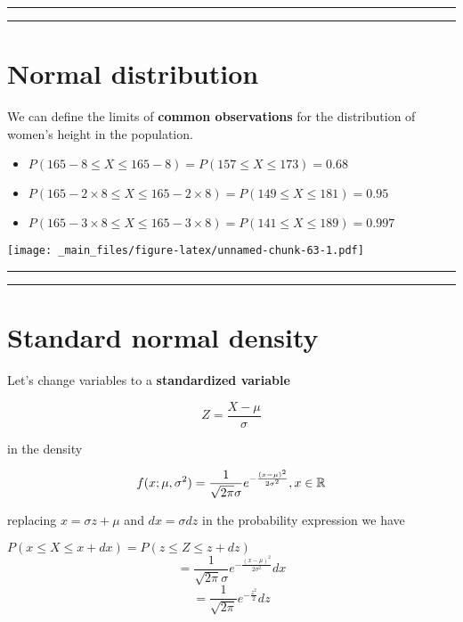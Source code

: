 \documentclass[
]{book}
\providecommand{\tightlist}{%
  \setlength{\itemsep}{0pt}\setlength{\parskip}{0pt}}
\begin{document}
\begin{center}\rule{0.5\linewidth}{0.5pt}\end{center}

\begin{center}\rule{0.5\linewidth}{0.5pt}\end{center}

\hypertarget{normal-distribution-5}{%
\section{Normal distribution}\label{normal-distribution-5}}

We can define the limits of \textbf{common observations} for the distribution of women's height in the population.

\begin{itemize}
\tightlist
\item
  \(P(165-8 \leq X \leq 165-8)=P(157 \leq X \leq 173)=0.68\)
\item
  \(P(165-2 \times 8 \leq X \leq 165-2\times 8)=P(149 \leq X \leq 181)=0.95\)
\item
  \(P(165-3 \times 8 \leq X \leq 165-3\times 8)=P(141 \leq X \leq 189)=0.997\)
\end{itemize}

\texttt{[image: \_main\_files/figure-latex/unnamed-chunk-63-1.pdf]}

\begin{center}\rule{0.5\linewidth}{0.5pt}\end{center}

\begin{center}\rule{0.5\linewidth}{0.5pt}\end{center}

\hypertarget{standard-normal-density}{%
\section{Standard normal density}\label{standard-normal-density}}

Let's change variables to a \textbf{standardized variable}

\[Z=\frac{X-\mu}{\sigma}\]

in the density

\[f(x; \mu, \sigma^2)=\frac{1}{\sqrt{2\pi}\sigma}e^{-\frac{(x-\mu)^2}{2\sigma^2}}, x \in {\Bbb R}\]

replacing \(x=\sigma z+\mu\) and \(dx=\sigma dz\) in the probability expression we have

\(P(x\leq X \leq x +dx)=P(z\leq Z \leq z +dz)\)
\[=\frac{1}{\sqrt{2\pi}\sigma}e^{-\frac{(x-\mu)^2}{2\sigma^2}}dx\] \[=\frac{1}{ \sqrt{2\pi}}e^{-\frac{z^2}{2}} dz\]
\end{document}

